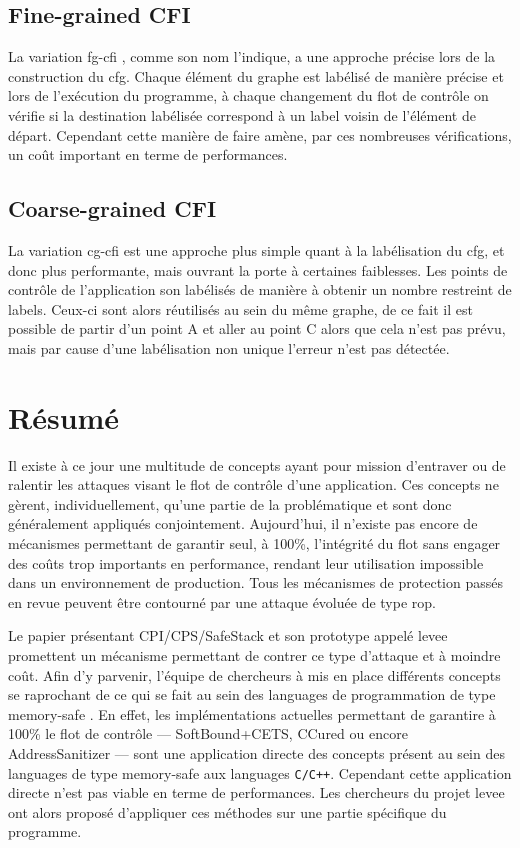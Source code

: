 \subsection{\og Fine-grained CFI \fg}

La variation \og \gls{fg-cfi} \fg \cite{FineCFI, FineCFIKernel}, comme son nom l'indique, a une approche précise lors de la construction du \gls{cfg}. Chaque élément du graphe est labélisé de manière précise et lors de l'exécution du programme, à chaque changement du flot de contrôle on vérifie si la destination labélisée correspond à un label voisin de l'élément de départ. Cependant cette manière de faire amène, par ces nombreuses vérifications, un coût important en terme de performances.

\subsection{\og Coarse-grained CFI \fg}

La variation \og \gls{cg-cfi} \fg est une approche plus simple quant à la labélisation du \gls{cfg},  et donc plus performante, mais ouvrant la porte à certaines faiblesses. Les points de contrôle de l'application son labélisés de manière à obtenir un nombre restreint de labels. Ceux-ci sont alors réutilisés au sein du même graphe, de ce fait il est possible de partir d'un point A et aller au point C alors que cela n'est pas prévu, mais par cause d'une labélisation non unique l'erreur n'est pas détectée.

\newpage

\section{Résumé}

Il existe à ce jour une multitude de concepts ayant pour mission d'entraver ou de ralentir les attaques visant le flot de contrôle d'une application. Ces concepts ne gèrent, individuellement, qu'une partie de la problématique et sont donc généralement appliqués conjointement. Aujourd'hui, il n'existe pas encore de mécanismes permettant de garantir seul, à 100\%, l'intégrité du flot sans engager des coûts trop importants en performance, rendant leur utilisation impossible dans un environnement de production. Tous les mécanismes de protection passés en revue peuvent être contourné par une attaque évoluée de type \gls{rop}.

Le papier présentant CPI/CPS/SafeStack \cite{CPIPaper} et son prototype appelé \gls{levee} promettent un mécanisme permettant de contrer ce type d'attaque et à moindre coût. Afin d'y parvenir, l'équipe de chercheurs à mis en place différents concepts se raprochant de ce qui se fait au sein des languages de programmation de type \og memory-safe \fg. En effet, les implémentations actuelles permettant de garantire à 100\% le flot de contrôle --- SoftBound+CETS, CCured ou encore AddressSanitizer --- sont une application directe des concepts présent au sein des languages de type \og memory-safe \fg aux languages \texttt{C/C++}. Cependant cette application directe n'est pas viable en terme de performances. Les chercheurs du projet \gls{levee} ont alors proposé d'appliquer ces méthodes sur une partie spécifique du programme.

